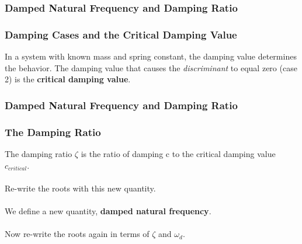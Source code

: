 \documentclass[fleqn]{beamer} %
\newcommand{\sectionIIsubsectionItitle}{Damped Natural Frequency and Damping Ratio}
\begin{document}
			\begin{frame}[label=sectionIIsubsectionI]
				\frametitle{\sectionIIsubsectionItitle}
				\bigskip

				\frametitle{Damping Cases and the Critical Damping Value}

				\large In a system with known mass and spring constant, the damping value determines the behavior. The damping value that causes the {\it discriminant} to equal zero (case 2) is the {\bf critical damping value}.  \vspc

				 \vspcc

				 \vspc


			
				\btVFill
			\end{frame}



			\begin{frame}[label=sectionIIsubsectionI]
				\frametitle{\sectionIIsubsectionItitle}
				\bigskip

				\frametitle{The Damping Ratio}

				\large The damping ratio $\zeta$ is the ratio of damping c to the critical damping value $c_{critical}$. \vspace{2mm}\\

				 \vspace{2mm}\\

				\large Re-write the roots with this new quantity. \vspace{2mm}\\

				  \vspace{2mm}\\

				\large We define a new quantity, {\bf damped natural frequency}.  \vspace{2mm}\\
					
				  \vspace{2mm}\\

				\large Now re-write the roots again in terms of $\zeta$ and $\omega_d$.  \vspace{2mm}\\

				  \vspace{2mm}\\
							
				\btVFill
			\end{frame}
\end{document}

